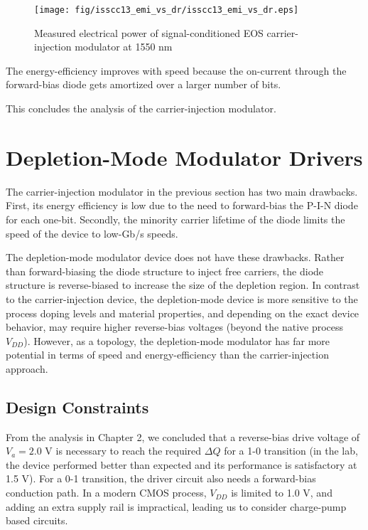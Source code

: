 	\begin{figure}[H]
		\begin{center}
			\texttt{[image: fig/isscc13\_emi\_vs\_dr/isscc13\_emi\_vs\_dr.eps]}
			\caption{\label{fig:isscc13_emi_vs_dr}Measured electrical power of signal-conditioned EOS carrier-injection modulator at 1550 nm}
		\end{center}
	\end{figure}

The energy-efficiency improves with speed because the on-current through the forward-bias diode gets amortized over a larger number of bits.

This concludes the analysis of the carrier-injection modulator.

\section{Depletion-Mode Modulator Drivers}

The carrier-injection modulator in the previous section has two main drawbacks.  First, its energy efficiency is low due to the need to forward-bias the P-I-N diode for each one-bit.  Secondly, the minority carrier lifetime of the diode limits the speed of the device to low-Gb/s speeds.

The depletion-mode modulator device does not have these drawbacks.  Rather than forward-biasing the diode structure to inject free carriers, the diode structure is reverse-biased to increase the size of the depletion region.  In contrast to the carrier-injection device, the depletion-mode device is more sensitive to the process doping levels and material properties, and depending on the exact device behavior, may require higher reverse-bias voltages (beyond the native process $V_{DD}$).  However, as a topology, the depletion-mode modulator has far more potential in terms of speed and energy-efficiency than the carrier-injection approach.

\subsection{Design Constraints}
From the analysis in Chapter 2, we concluded that a reverse-bias drive voltage of $V_a = 2.0$ V is necessary to reach the required $\Delta Q$ for a 1-0 transition (in the lab, the device performed better than expected and its performance is satisfactory at 1.5 V).  For a 0-1 transition, the driver circuit also needs a forward-bias conduction path.  In a modern CMOS process, $V_{DD}$ is limited to 1.0 V, and adding an extra supply rail is impractical, leading us to consider charge-pump based circuits.

